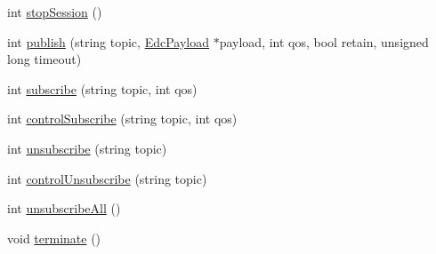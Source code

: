 \begin{DoxyCompactItemize}
\item 
int \hyperlink{class_edc_cloud_client_a3280f3900fd2e67371c8bfdace723005}{stop\-Session} ()
\item 
int \hyperlink{class_edc_cloud_client_a710979b808649f8ff0851dfc685c2964}{publish} (string topic, \hyperlink{classedcdatatypes_1_1_edc_payload}{Edc\-Payload} $\ast$payload, int qos, bool retain, unsigned long timeout)
\item 
int \hyperlink{class_edc_cloud_client_a6c8964ba0052177c7c469adeb26dc90a}{subscribe} (string topic, int qos)
\item 
int \hyperlink{class_edc_cloud_client_ae5781b8ec7a9be553b2676aea8133c4f}{control\-Subscribe} (string topic, int qos)
\item 
int \hyperlink{class_edc_cloud_client_aa9b2ab93edb9046bf10232f577dc5893}{unsubscribe} (string topic)
\item 
int \hyperlink{class_edc_cloud_client_a0cabdc1660a6e717e56776b88f351a1a}{control\-Unsubscribe} (string topic)
\item 
int \hyperlink{class_edc_cloud_client_a713be75330026d382130830c8d0239a0}{unsubscribe\-All} ()
\item 
void \hyperlink{class_edc_cloud_client_aa5b3ec78379a6186f7f0b244f0691bb8}{terminate} ()
\end{DoxyCompactItemize}


